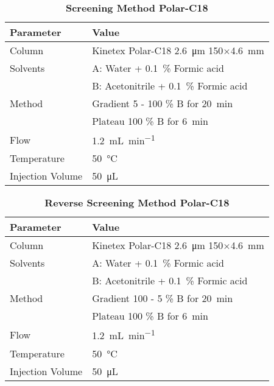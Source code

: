 	\begin{table}[htbp]
		\caption[Screening Method Polar-C18]{\textbf{Screening Method Polar-C18}}
		\label{tab:method_polarc18_screening}
		\centering
		\begin{tabularx}{\textwidth}{XX}
			\toprule
			\textbf{Parameter}	& \textbf{Value}	\\
			\midrule
			Column 		& Kinetex Polar-C18 \SI{2.6}{\micro\meter} 150$\times$\SI{4.6}{\milli\meter} 	\\
			Solvents	& A: Water + 0.1~\% Formic acid 	\\
						& B: Acetonitrile + 0.1~\% Formic acid		\\
			Method 		& Gradient 5 - 100 \% B for \SI{20}{\minute} 	\\
						& Plateau 100 \% B for \SI{6}{\minute} 	\\
			Flow 		& \SI{1.2}{\milli\liter\per\minute} \\
			Temperature & \SI{50}{\celsius} 	\\
			Injection Volume 	& \SI{50}{\micro\liter} 	\\
			\bottomrule
		\end{tabularx}
	\end{table}

	\begin{table}[htbp]
		\caption[Reverse Screening Method Polar-C18]{\textbf{Reverse Screening Method Polar-C18}}
		\label{tab:method_polarc18_revscreening}
		\centering
		\begin{tabularx}{\textwidth}{XX}
			\toprule
			\textbf{Parameter}	& \textbf{Value}	\\
			\midrule
			Column 		& Kinetex Polar-C18 \SI{2.6}{\micro\meter} 150$\times$\SI{4.6}{\milli\meter} 	\\
			Solvents	& A: Water + 0.1~\% Formic acid 	\\
						& B: Acetonitrile + 0.1~\% Formic acid		\\
			Method 		& Gradient 100 - 5 \% B for \SI{20}{\minute} 	\\
						& Plateau 100 \% B for \SI{6}{\minute} 	\\
			Flow 		& \SI{1.2}{\milli\liter\per\minute} \\
			Temperature & \SI{50}{\celsius} 	\\
			Injection Volume 	& \SI{50}{\micro\liter} 	\\
			\bottomrule
		\end{tabularx}
	\end{table}

